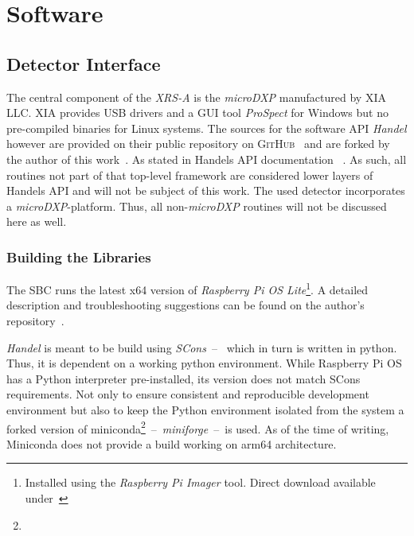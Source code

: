 \chapter{Software}
    \section{Detector Interface}
        The central component of the \textit{XRS-A} is the \textit{microDXP} manufactured by \textsc{XIA LLC}.
        \textsc{XIA} provides USB drivers and a GUI tool \textit{ProSpect} for Windows but no pre-compiled binaries for Linux systems.
        The sources for the software API \textit{Handel} however are provided on their public repository on \textsc{GitHub}~\cite{Software.HandelRelease.2023} and are forked by the author of this work~\cite{Software.XraythesisHandel.2023}.
        As stated in Handels API documentation ~\cite{Manual.HandelAPIManual.Xiang}.
        As such, all routines not part of that top-level framework are considered lower layers of Handels API and will not be subject of this work.
        The used detector incorporates a \textit{microDXP}-platform.
        Thus, all non-\textit{microDXP} routines will not be discussed here as well.\par\medskip

        \subsection{Building the Libraries}\label{sec:building libraries}
            The SBC runs the latest x64 version of \textit{Raspberry Pi OS Lite}\footnote{Installed using the \textit{Raspberry Pi Imager} tool.
            Direct download available under~\cite{Software.RaspberryPiOSLite.2023}}.
            A detailed description and troubleshooting suggestions can be found on the author's repository~\cite{Software.XraythesisHandel.2023}.\par\medskip

            \textit{Handel} is meant to be build using \textit{SCons}~--~ which in turn is written in python.
            Thus, it is dependent on a working python environment.
            While Raspberry Pi OS has a Python interpreter pre-installed, its version does not match SCons requirements.
            Not only to ensure consistent and reproducible development environment but also to keep the Python environment isolated from the system a forked version of miniconda\footnote{}~--~\textit{miniforge}~--~is used.
            As of the time of writing, Miniconda does not provide a build working on arm64 architecture.

